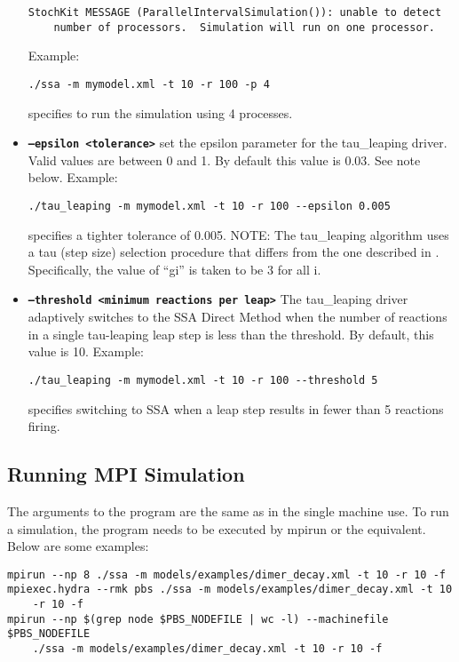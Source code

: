 \documentclass[11pt,letterpaper]{article}
\begin{document}
\begin{itemize}
\begin{lstlisting}
StochKit MESSAGE (ParallelIntervalSimulation()): unable to detect 
    number of processors.  Simulation will run on one processor.
\end{lstlisting}
Example: 
\begin{lstlisting}
./ssa -m mymodel.xml -t 10 -r 100 -p 4
\end{lstlisting}
specifies to run the simulation using 4 processes.
\item \texttt{\textbf{--epsilon <tolerance>}} set the epsilon parameter for the tau\_leaping driver.  Valid values are between 0 and 1.  By default this value is 0.03.  See note below.
Example: 
\begin{lstlisting}
./tau_leaping -m mymodel.xml -t 10 -r 100 --epsilon 0.005
\end{lstlisting}
specifies a tighter tolerance of 0.005.
NOTE: The tau\_leaping algorithm uses a tau (step size) selection procedure that differs from the one described in \cite{Cao2008}.  Specifically, the value of ``gi'' is taken to be 3 for all i.
\item \texttt{\textbf{--threshold <minimum reactions per leap>}}  The tau\_leaping driver adaptively switches to the SSA Direct Method when the number of reactions in a single tau-leaping leap step is less than the threshold.  By default, this value is 10.
Example: 
\begin{lstlisting}
./tau_leaping -m mymodel.xml -t 10 -r 100 --threshold 5
\end{lstlisting}
specifies switching to SSA when a leap step results in fewer than 5 reactions firing.
\end{itemize}

\subsection{Running MPI Simulation}
The arguments to the program are the same as in the single machine use. To run a simulation, the program needs to be executed by mpirun or the equivalent. Below are some examples:

\begin{lstlisting}
mpirun --np 8 ./ssa -m models/examples/dimer_decay.xml -t 10 -r 10 -f
mpiexec.hydra --rmk pbs ./ssa -m models/examples/dimer_decay.xml -t 10 
    -r 10 -f
mpirun --np $(grep node $PBS_NODEFILE | wc -l) --machinefile $PBS_NODEFILE 
    ./ssa -m models/examples/dimer_decay.xml -t 10 -r 10 -f
\end{lstlisting}
\end{document}
